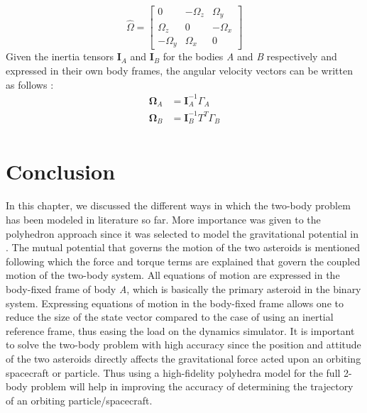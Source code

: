 \begin{equation}
\label{omega_hat}
\hat{\Omega}
=
\begin{bmatrix}
0	&	-\Omega_z	&	\Omega_y \\
\Omega_z	&	0	&	-\Omega_x \\
-\Omega_y	&	\Omega_x	&	0
\end{bmatrix}
\end{equation}
%
Given the inertia tensors $\mathbf{I}_A$ and $\mathbf{I}_B$ for the bodies \textit{A} and \textit{B} respectively and expressed in their own body frames, the angular velocity vectors can be written as follows \cite{fahn_poly}:
\begin{align}
\label{omega_A}
\mathbf{\Omega}_A &= \mathbf{I}_A^{-1} \Gamma_A \\
\label{omega_B}
\mathbf{\Omega}_B &= \mathbf{I}_B^{-1} T^T \Gamma_B \\
\end{align}
%

\section{Conclusion}
In this chapter, we discussed the different ways in which the two-body problem has been modeled in literature so far. More importance was given to the polyhedron approach since it was selected to model the gravitational potential in . The mutual potential that governs the motion of the two asteroids is mentioned following which the force and torque terms are explained that govern the coupled motion of the two-body system. All equations of motion are expressed in the body-fixed frame of body \textit{A}, which is basically the primary asteroid in the binary system. Expressing equations of motion in the body-fixed frame allows one to reduce the size of the state vector compared to the case of using an inertial reference frame, thus easing the load on the dynamics simulator. It is important to solve the two-body problem with high accuracy since the position and attitude of the two asteroids directly affects the gravitational force acted upon an orbiting spacecraft or particle. Thus using a high-fidelity polyhedra model for the full 2-body problem will help in improving the accuracy of determining the trajectory of an orbiting particle/spacecraft.
